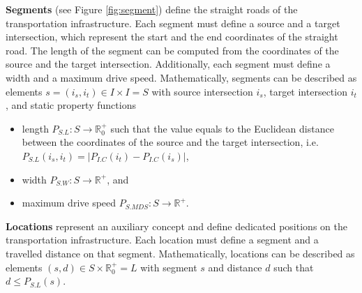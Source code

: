 \documentclass[graybox]{svmult}
\begin{document}
\noindent
\textbf{Segments} (see Figure \ref{fig:segment})
define the straight roads of the transportation infrastructure.
Each segment must define a source and a target intersection, which represent the start and the end coordinates of the straight road.
The length of the segment can be computed from the coordinates of the source and the target intersection.
Additionally, each segment must define a width and a maximum drive speed.
Mathematically, segments can be described as elements $s = (i_s, i_t) \in I \times I = S$ with source intersection $i_s$, target intersection $i_t$, and static property functions
\begin{itemize}
	\item length $P_{S.L}: S \rightarrow \mathbb{R}_0^+$ such that the value equals to the Euclidean distance between the coordinates of the source and the target intersection, i.e.\ $P_{S.L}(i_s, i_t) = |P_{I.C}(i_t) - P_{I.C}(i_s)|$,
	\item width $P_{S.W}: S \rightarrow \mathbb{R}^+$, and
	\item maximum drive speed $P_{S.MDS}: S \rightarrow \mathbb{R}^+$.
\end{itemize}
\vspace{-2mm}


\vspace{4mm}
\noindent
\textbf{Locations}
represent an auxiliary concept and define dedicated positions on the transportation infrastructure.
Each location must define a segment and a travelled distance on that segment.
Mathematically, locations can be described as elements $(s, d) \in S \times \mathbb{R}_0^+ = L$ with segment $s$ and distance $d$ such that $d \leq P_{S.L}(s)$.

\end{document}

